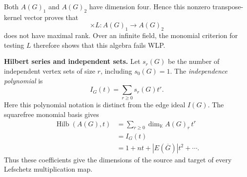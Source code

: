 Both $A(G)_1$ and $A(G)_2$ have
dimension four. Hence this nonzero
transpose-kernel vector proves that
$$
\times L:A(G)_1\longrightarrow A(G)_2
$$
does not have maximal rank.
Over an infinite field, the monomial
criterion for testing $L$ therefore
shows that this algebra fails WLP.

\medskip\noindent
\textbf{Hilbert series and independent
sets.}
Let $s_r(G)$ be the number of independent
vertex sets of size $r$, including
$s_0(G)=1$.
The \emph{independence polynomial} is
$$
I_G(t)=\sum_{r\geq0}s_r(G)t^r.
$$
Here this polynomial notation is
distinct from the edge ideal $I(G)$.
The squarefree monomial basis gives
$$
\begin{aligned}
\operatorname{Hilb}(A(G),t)
&=\sum_{r\geq0}\dim_{\mathbb K}A(G)_r\,t^r\\
&=I_G(t)\\
&=1+nt+|E(\overline G)|t^2+\cdots.
\end{aligned}
$$
Thus these coefficients give the
dimensions of the source and target
of every Lefschetz multiplication map.

